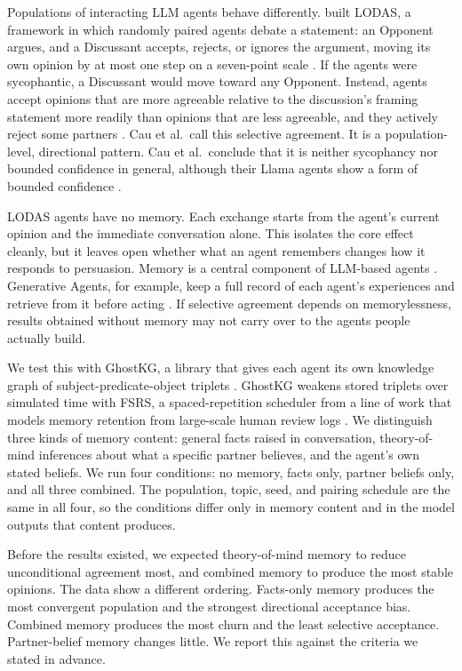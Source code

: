 \documentclass[11pt,a4paper]{article}
\begin{document}
Populations of interacting LLM agents behave differently. \citet{cau2025selective} built LODAS, a framework in which randomly paired agents debate a statement: an Opponent argues, and a Discussant accepts, rejects, or ignores the argument, moving its own opinion by at most one step on a seven-point scale \citep{cau2025selective}. If the agents were sycophantic, a Discussant would move toward any Opponent. Instead, agents accept opinions that are more agreeable relative to the discussion's framing statement more readily than opinions that are less agreeable, and they actively reject some partners \citep{cau2025selective}. Cau et al.\ call this selective agreement. It is a population-level, directional pattern. Cau et al.\ conclude that it is neither sycophancy nor bounded confidence in general, although their Llama agents show a form of bounded confidence \citep{cau2025selective}.

LODAS agents have no memory. Each exchange starts from the agent's current opinion and the immediate conversation alone. This isolates the core effect cleanly, but it leaves open whether what an agent remembers changes how it responds to persuasion. Memory is a central component of LLM-based agents \citep{zhang2025memorysurvey}. Generative Agents, for example, keep a full record of each agent's experiences and retrieve from it before acting \citep{park2023generative}. If selective agreement depends on memorylessness, results obtained without memory may not carry over to the agents people actually build.

We test this with GhostKG, a library that gives each agent its own knowledge graph of subject-predicate-object triplets \citep{ghostkg}. GhostKG weakens stored triplets over simulated time with FSRS, a spaced-repetition scheduler \citep{fsrs_algorithm} from a line of work that models memory retention from large-scale human review logs \citep{ye2022ssp,su2023dynamics}. We distinguish three kinds of memory content: general facts raised in conversation, theory-of-mind inferences about what a specific partner believes, and the agent's own stated beliefs. We run four conditions: no memory, facts only, partner beliefs only, and all three combined. The population, topic, seed, and pairing schedule are the same in all four, so the conditions differ only in memory content and in the model outputs that content produces.

Before the results existed, we expected theory-of-mind memory to reduce unconditional agreement most, and combined memory to produce the most stable opinions. The data show a different ordering. Facts-only memory produces the most convergent population and the strongest directional acceptance bias. Combined memory produces the most churn and the least selective acceptance. Partner-belief memory changes little. We report this against the criteria we stated in advance.
\end{document}
